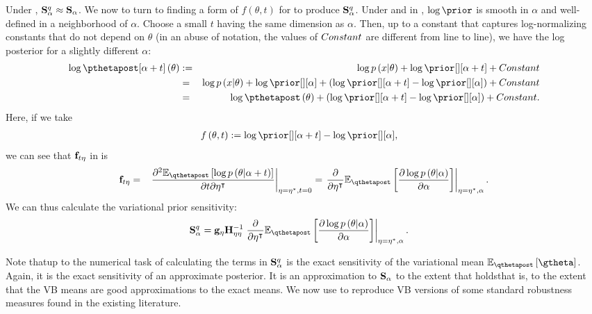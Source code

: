 \documentclass{article}\usepackage[]{graphicx}\usepackage[]{color}
\theoremstyle{plain}
\theoremstyle{definition}
\theoremstyle{plain}
\theoremstyle{plain}
\theoremstyle{plain}
\theoremstyle{plain}
\begin{document}
Under , $\mathbf{S}_{\alpha}^{q}\approx\mathbf{S}_{\alpha}$. We now
to turn to finding a form of $f\left(\theta,t\right)$ for 
to produce $\mathbf{S}_{\alpha}^{q}$. Under  and 
in , $\log\prior$ is smooth in $\alpha$
and well-defined in a neighborhood of $\alpha$. Choose a small $t$
having the same dimension as $\alpha$. Then, up to a constant that
captures log-normalizing constants that do not depend on $\theta$
(in an abuse of notation, the values of $Constant$ are different
from line to line), we have the log posterior for a slightly different
$\alpha$:
\begin{eqnarray*}
\log\pthetapost[\alpha+t]\left(\theta\right) & := & \log p\left(x\vert\theta\right)+\log\prior[][\alpha+t]+\constant\\
 & = & \log p\left(x\vert\theta\right)+\log\prior[][\alpha]+\left(\log\prior[][\alpha+t]-\log\prior[][\alpha]\right)+\constant\\
 & = & \log\pthetapost\left(\theta\right)+\left(\log\prior[][\alpha+t]-\log\prior[][\alpha]\right)+\constant.
\end{eqnarray*}
Here, if we take
\begin{align*}
f\left(\theta,t\right) & :=\log\prior[][\alpha+t]-\log\prior[][\alpha],
\end{align*}
we can see that $\mathbf{f}_{t\eta}$ in  is
\begin{eqnarray}
\efhess & = & \left.\frac{\partial^{2}\mbeq\left[\log p\left(\theta\vert\alpha+t\right)\right]}{\partial t\partial\eta^{\trans}}\right|_{\eta=\etaopt,t=0}=\left.\frac{\partial}{\partial\eta^{\trans}}\mbeq\left[\frac{\partial\log p\left(\theta\vert\alpha\right)}{\partial\alpha}\right]\right|_{\eta=\etaopt,\alpha}.\label{eq:lrvb_parametric_sens}
\end{eqnarray}
We can thus calculate the variational prior sensitivity:
\begin{align}
\qsens & =\eggrad\klhess^{-1}\left.\frac{\partial}{\partial\eta^{\trans}}\mbeq\left[\frac{\partial\log p\left(\theta\vert\alpha\right)}{\partial\alpha}\right]\right|_{\eta=\etaopt,\alpha}.\label{eq:variational_local_robustness}
\end{align}

Note that\textemdash up to the numerical task of calculating the terms
in \textemdash $\mathbf{S}_{\alpha}^{q}$
is the exact sensitivity of the variational mean $\eqgtheta$. Again,
it is the exact sensitivity of an approximate posterior. It is an
approximation to $\mathbf{S}_{\alpha}$ to the extent that 
holds\textemdash that is, to the extent that the VB means are good
approximations to the exact means. We now use 
to reproduce VB versions of some standard robustness measures found
in the existing literature.
\end{document}
